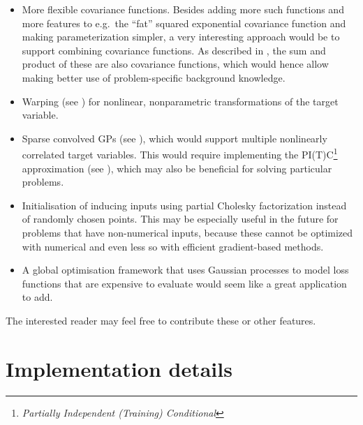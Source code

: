 \documentclass[10pt]{report}
\begin{document}
\begin{itemize}
\item More flexible covariance functions.  Besides adding more such functions
and more features to e.g.\ the ``fat'' squared exponential covariance function
and making parameterization simpler, a very interesting approach would be to
support combining covariance functions.  As described in
\cite{oai:eprints.pascal-network.org:1211}, the sum and product of these are
also covariance functions, which would hence allow making better use of
problem-specific background knowledge.
\item Warping (see \cite{conf/nips/SnelsonRG03}) for nonlinear, nonparametric
transformations of the target variable.
\item Sparse convolved GPs (see \cite{DBLP:conf/nips/AlvarezL08}), which would
support multiple nonlinearly correlated target variables.  This would require
implementing the PI(T)C\footnote{\emph{Partially Independent (Training)
Conditional}} approximation (see \cite{SnelsonThesis}), which may also be
beneficial for solving particular problems.
\item Initialisation of inducing inputs using partial Cholesky factorization
instead of randomly chosen points.  This may be especially useful in the future
for problems that have non-numerical inputs, because these cannot be optimized
with numerical and even less so with efficient gradient-based methods.
\item A global optimisation framework that uses Gaussian processes to model loss
functions that are expensive to evaluate would seem like a great application to
add.
\end{itemize}

The interested reader may feel free to contribute these or other features.

\appendix

\chapter{Implementation details}

\newcommand{\red}{\textcolor{red}}
\newcommand{\blue}{\textcolor{blue}}

\newcommand{\dif}{\mathrm{d}}

\newcommand{\myu}[1]{\underaccent{\bar}{#1}}

\newcommand{\onehalf}{\tfrac{1}{2}}

\newcommand{\mat}[1]{\mbox{$\mathsfsl{#1}$}}
\newcommand{\myvec}[1]{\mbox{\boldmath$#1$}}
\end{document}
